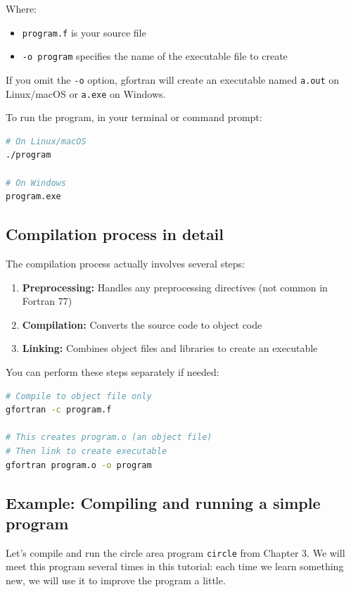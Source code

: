 Where:
\begin{itemize}
    \item \texttt{program.f} is your source file
    \item \texttt{-o program} specifies the name of the executable file to create
\end{itemize}

If you omit the \texttt{-o} option, gfortran will create an executable named \texttt{a.out} on Linux/macOS or \texttt{a.exe} on Windows.

To run the program, in your terminal or command prompt:

\begin{lstlisting}[language=bash]
# On Linux/macOS
./program

# On Windows
program.exe
\end{lstlisting}

\subsection{Compilation process in detail}

The compilation process actually involves several steps:

\begin{enumerate}
    \item \textbf{Preprocessing:} Handles any preprocessing directives (not common in Fortran 77)
    \item \textbf{Compilation:} Converts the source code to object code
    \item \textbf{Linking:} Combines object files and libraries to create an executable
\end{enumerate}

You can perform these steps separately if needed:

\begin{lstlisting}[language=bash]
# Compile to object file only
gfortran -c program.f

# This creates program.o (an object file)
# Then link to create executable
gfortran program.o -o program
\end{lstlisting}

\subsection{Example: Compiling and running a simple program}

Let's compile and run the circle area program \texttt{circle} from Chapter 3. We will meet this program several times in this tutorial: each time we learn something new, we will use it to improve the program a little.

